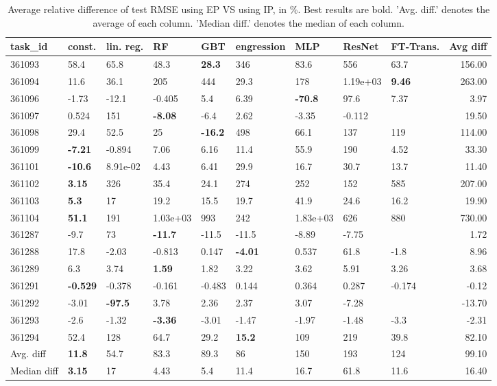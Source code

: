 \begin{table}[ht!]
\centering
\begingroup\footnotesize
\begin{tabular}{lllllllllr}
  \hline
\hline
task\_id & const. & lin. reg. & RF & GBT & engression & MLP & ResNet & FT-Trans. & Avg diff \\ 
  \hline
361093 & 58.4 & 65.8 & 48.3 & \textbf{28.3} & 346 & 83.6 & 556 & 63.7 & 156.00 \\ 
  361094 & 11.6 & 36.1 & 205 & 444 & 29.3 & 178 & 1.19e+03 & \textbf{9.46} & 263.00 \\ 
  361096 & -1.73 & -12.1 & -0.405 & 5.4 & 6.39 & \textbf{-70.8} & 97.6 & 7.37 & 3.97 \\ 
  361097 & 0.524 & 151 & \textbf{-8.08} & -6.4 & 2.62 & -3.35 & -0.112 &  & 19.50 \\ 
  361098 & 29.4 & 52.5 & 25 & \textbf{-16.2} & 498 & 66.1 & 137 & 119 & 114.00 \\ 
  361099 & \textbf{-7.21} & -0.894 & 7.06 & 6.16 & 11.4 & 55.9 & 190 & 4.52 & 33.30 \\ 
  361101 & \textbf{-10.6} & 8.91e-02 & 4.43 & 6.41 & 29.9 & 16.7 & 30.7 & 13.7 & 11.40 \\ 
  361102 & \textbf{3.15} & 326 & 35.4 & 24.1 & 274 & 252 & 152 & 585 & 207.00 \\ 
  361103 & \textbf{5.3} & 17 & 19.2 & 15.5 & 19.7 & 41.9 & 24.6 & 16.2 & 19.90 \\ 
  361104 & \textbf{51.1} & 191 & 1.03e+03 & 993 & 242 & 1.83e+03 & 626 & 880 & 730.00 \\ 
  361287 & -9.7 & 73 & \textbf{-11.7} & -11.5 & -11.5 & -8.89 & -7.75 &  & 1.72 \\ 
  361288 & 17.8 & -2.03 & -0.813 & 0.147 & \textbf{-4.01} & 0.537 & 61.8 & -1.8 & 8.96 \\ 
  361289 & 6.3 & 3.74 & \textbf{1.59} & 1.82 & 3.22 & 3.62 & 5.91 & 3.26 & 3.68 \\ 
  361291 & \textbf{-0.529} & -0.378 & -0.161 & -0.483 & 0.144 & 0.364 & 0.287 & -0.174 & -0.12 \\ 
  361292 & -3.01 & \textbf{-97.5} & 3.78 & 2.36 & 2.37 & 3.07 & -7.28 &  & -13.70 \\ 
  361293 & -2.6 & -1.32 & \textbf{-3.36} & -3.01 & -1.47 & -1.97 & -1.48 & -3.3 & -2.31 \\ 
  361294 & 52.4 & 128 & 64.7 & 29.2 & \textbf{15.2} & 109 & 219 & 39.8 & 82.10 \\ 
   \hline
Avg. diff & \textbf{11.8} & 54.7 & 83.3 & 89.3 & 86 & 150 & 193 & 124 & 99.10 \\ 
  Median diff & \textbf{3.15} & 17 & 4.43 & 5.4 & 11.4 & 16.7 & 61.8 & 11.6 & 16.40 \\ 
   \hline
\hline
\end{tabular}
\endgroup
\caption{Average relative difference of test RMSE using EP VS using IP, in \%. 
                  Best results are bold. 
                  'Avg. diff.' denotes the average of each column.
                  'Median diff.' denotes the median of each column.} 
\label{TABLES/table_results_RMSE_umap_num_and_cat_features_EP_VS_IP}
\end{table}
